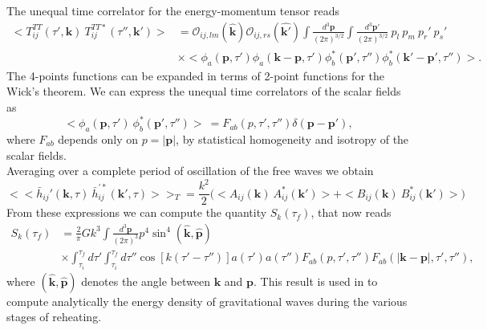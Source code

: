 \documentclass[11pt,a4paper,twoside]{book}
\begin{document}
 The unequal time correlator for the energy-momentum tensor reads
 \begin{equation} 	
 \begin{split}
 		\label{Chap7:UnequalTimeCorrelators}
  <T^{TT}_{ij}(\tau',\textbf{k})\ T^{TT*}_{ij}(\tau'',\textbf{k}')>
&= \mathcal{O}_{ij,lm}(\hat{\textbf{k}})\mathcal{O}_{ij,rs}(\hat{\textbf{k}'})
\int \frac{d^{3} \textbf{p}}{(2\pi)^{3/2}} \int \frac{d^{3} \textbf{p}'}{(2\pi)^{3/2}}\ p_{l}\ p_{m}\ p_{r}'\ p_{s}' \\
&  \times <\phi_{a}(\textbf{p},\tau')\phi_{a}(\textbf{k}-\textbf{p},\tau')\phi_{b}^{*}(\textbf{p}',\tau'')\phi_{b}^{*}(\textbf{k}'-\textbf{p}',\tau'')>.
\end{split} 	 
 \end{equation}
The 4-points functions can be expanded in terms of 2-point functions for the Wick's theorem. We can express the unequal time correlators of the scalar fields  as 
\begin{equation}
\label{Chap7:correlatorsPhi}
<\phi_{a}(\textbf{p},\tau')\ \phi_{b}^{*}(\textbf{p}',\tau'')> \ =F_{ab}(p,\tau',\tau'')\delta(\textbf{p}-\textbf{p}'),
\end{equation}
where $ F_{ab} $ depends only on $ p=|\textbf{p}| $, by statistical homogeneity and isotropy of the scalar fields.\\
Averaging over a complete period of oscillation of the free waves we obtain
\begin{equation}
\label{Chap7:average}
<<\bar{h}_{ij}'(\textbf{k},\tau)\ \bar{h}^{'*}_{ij}(\textbf{k}',\tau)>>_{T}=\frac{k^{2}}{2}\Big(<A_{ij}(\textbf{k})\ A^{*}_{ij}(\textbf{k}')> + <B_{ij}(\textbf{k})\ B^{*}_{ij}(\textbf{k}')>\Big)
\end{equation}
From these expressions we can compute the quantity $ S_{k}(\tau_{f}) $, that now reads
\begin{equation}
\label{Chap7:quantitySk}
\begin{split}
S_{k}(\tau_{f}) & =\frac{2}{\pi}Gk^{3}\int \frac{d^{3} \textbf{p}}{(2\pi)^{3}}p^{4}\sin^{4}(\hat{\textbf{k}},\hat{\textbf{p}}) \\
               & \times \int_{\tau_{i}}^{\tau_{f}} d\tau' \int_{\tau_{i}}^{\tau_{f}} d\tau'' \cos [k(\tau'-\tau'')] a(\tau')a(\tau'')F_{ab}(p,\tau ',\tau'') F_{ab}(|\textbf{k}-\textbf{p}|,\tau',\tau''),  
\end{split}
\end{equation}
where $ (\hat{\textbf{k}},\hat{\textbf{p}}) $ denotes the angle between $ \textbf{k} $ and $ \textbf{p} $. This result is used in \cite{Chap7:GreenMethod} to compute analytically the energy density of gravitational waves during the various stages of reheating.
\end{document}
